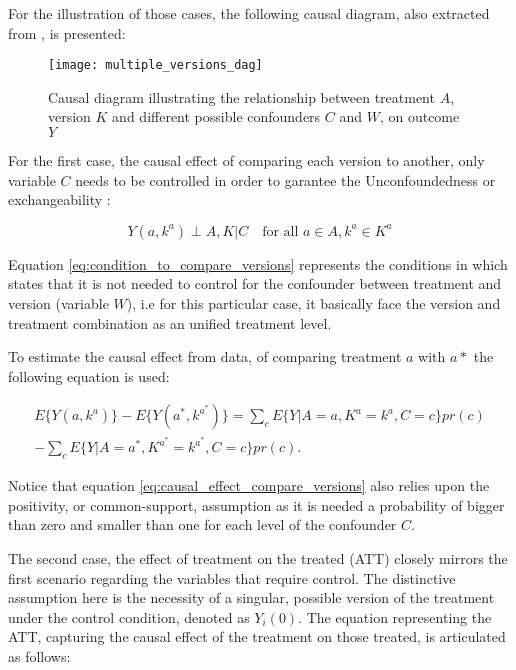 For the illustration of those cases, the following causal diagram, also extracted from \textcite{vanderweeleCausalInferenceMultiple2013}, is presented: 

\begin{figure}[htbp]
  \centering
  \texttt{[image: multiple\_versions\_dag]}
  \caption{Causal diagram illustrating the relationship between treatment $A$, version $K$ and different possible confounders $C$ and $W$, on outcome $Y$}
  \label{fig:causal_dag_multiple_versions}
\end{figure}

For the first case, the causal effect of comparing each version to another, only variable $C$ needs to be controlled in order to garantee the Unconfoundedness or exchangeability : 

\begin{equation}
  Y(a, k^{a}) \perp{{A,K} | C} \quad \text{for all } a \in A, k^{a} \in K^{a}
  \label{eq:condition_to_compare_versions}
\end{equation}

Equation \ref{eq:condition_to_compare_versions} represents the conditions in which states that it is not needed to control for the confounder between treatment and version (variable $W$), i.e for this particular case, it basically face the version and treatment combination as an unified treatment level.

To estimate the causal effect from data, of comparing treatment $a$ with $a*$ the following equation is used:

\begin{equation}
  \begin{aligned}
    E\{Y(a, k^{a})\} - E\{Y(a^{*}, k^{a^*})\} = \sum_{c} E\{Y|A = a, K^{a} = k^{a}, C = c\}pr(c) \\
     - \sum_{c} E\{Y|A = a^{*}, K^{a^*} = k^{a^*}, C = c\}pr(c).
  \end{aligned}
  \label{eq:causal_effect_compare_versions}
\end{equation}

Notice that equation \ref{eq:causal_effect_compare_versions} also relies upon the positivity, or common-support, assumption as it is needed a probability of bigger than zero and smaller
than one for each level of the confounder $C$.

The second case, the effect of treatment on the treated (\gls{ATT}) closely mirrors the first scenario regarding the variables that require control. The distinctive assumption here is the necessity of a singular,
possible version of the treatment under the control condition, denoted as $Y_i(0)$. The equation representing the \gls{ATT}, capturing the causal effect of the treatment on those treated, is articulated as follows:

